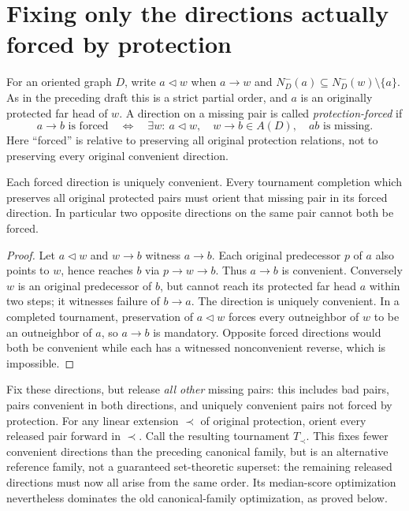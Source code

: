 \section{Fixing only the directions actually forced by protection}
\label{sec:protection-forced-completion}

For an oriented graph $D$, write $a\triangleleft w$ when
$a\to w$ and $N_D^-(a)\subseteq N_D^-(w)\setminus\{a\}$.
As in the preceding draft this is a strict partial order, and $a$ is
an originally protected far head of $w$. A direction on a missing pair
is called \emph{protection-forced} if
\begin{equation}
 a\to b\text{ is forced}\quad\Longleftrightarrow\quad
 \exists w:\ a\triangleleft w,\quad w\to b\in A(D),\quad ab
 \text{ is missing}.
 \label{eq:protection-forced-definition}
\end{equation}
Here ``forced'' is relative to preserving all original protection
relations, not to preserving every original convenient direction.

\begin{lemma}
\label{lem:protection-forced-consistency}
Each forced direction is uniquely convenient. Every tournament
completion which preserves all original protected pairs must orient
that missing pair in its forced direction. In particular two opposite
directions on the same pair cannot both be forced.
\end{lemma}
\begin{proof}
Let $a\triangleleft w$ and $w\to b$ witness $a\to b$.
Each original predecessor $p$ of $a$ also points to $w$, hence reaches
$b$ via $p\to w\to b$. Thus $a\to b$ is convenient.
Conversely $w$ is an original predecessor of $b$, but cannot reach
its protected far head $a$ within two steps; it witnesses failure of
$b\to a$. The direction is uniquely convenient.
In a completed tournament, preservation of $a\triangleleft w$
forces every outneighbor of $w$ to be an outneighbor of $a$, so
$a\to b$ is mandatory. Opposite forced directions would both be
convenient while each has a witnessed nonconvenient reverse, which
is impossible.
\end{proof}

Fix these directions, but release \emph{all other} missing pairs:
this includes bad pairs, pairs convenient in both directions, and
uniquely convenient pairs not forced by protection. For any linear
extension $\prec$ of original protection, orient every released pair
forward in $\prec$. Call the resulting tournament $T_\prec$.
This fixes fewer convenient directions than the preceding canonical
family, but is an alternative reference family, not a guaranteed
set-theoretic superset: the remaining released directions must now
all arise from the same order. Its median-score optimization nevertheless
dominates the old canonical-family optimization, as proved below.

